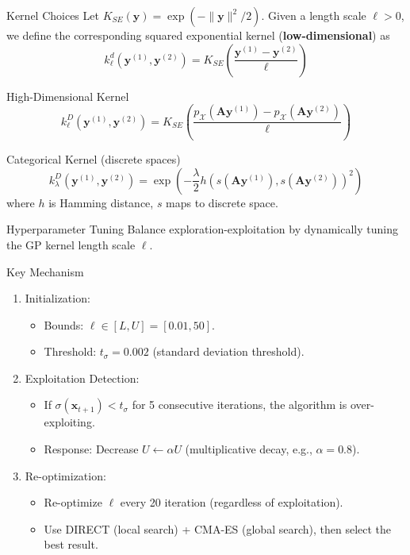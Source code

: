 \documentclass[aspectratio=169]{beamer}
\begin{document}
\begin{frame}{Kernel Choices}
    Let $K_{SE}(\mathbf{y}) = \exp(-\|\mathbf{y}\|^2/2)$.
Given a length scale $\ell > 0$, we define the corresponding {squared exponential} kernel (\textbf{low-dimensional}) as 
    \[
        k_{\ell}^d(\mathbf{y}^{(1)},\mathbf{y}^{(2)}) = K_{SE}\left(\frac{\mathbf{y}^{(1)}-\mathbf{y}^{(2)}}{\ell}\right)
    \]
    \vspace{-0.5cm}
    \begin{block}{High-Dimensional Kernel} 
        \[
        k_{\ell}^D(\mathbf{y}^{(1)}, \mathbf{y}^{(2)}) = K_{SE}\left( \frac{p_{\mathcal{X}}(\mathbf{A}\mathbf{y}^{(1)}) - p_{\mathcal{X}}(\mathbf{A}\mathbf{y}^{(2)})}{\ell} \right)
        \]
    \end{block}
    \vspace{-0.5cm}
    \begin{block}{Categorical Kernel (discrete spaces)}
        \[
        k^D_{\lambda}(\mathbf{y}^{(1)}, \mathbf{y}^{(2)}) = \exp\left(-\frac{\lambda}{2} h(s(\mathbf{A}\mathbf{y}^{(1)}), s(\mathbf{A}\mathbf{y}^{(2)}))^2 \right)
        \]  
        where \( h \) is Hamming distance, \( s \) maps to discrete space.
    \end{block}
\end{frame}

\begin{frame}{Hyperparameter Tuning}
    Balance exploration-exploitation by dynamically tuning the GP kernel length scale $\ell$.
    \begin{block}{Key Mechanism}
        \begin{enumerate}
            \item Initialization:
            \begin{itemize}
                \item Bounds: $\ell \in [L, U] = [0.01, 50]$.
                \item Threshold: $t_\sigma = 0.002$ (standard  deviation threshold).
            \end{itemize}
            \item Exploitation Detection:
            \begin{itemize}
                \item If $\sigma(\mathbf{x}_{t+1}) < t_\sigma$ for 5 consecutive iterations, the algorithm is over-exploiting.
                \item Response: Decrease $U \leftarrow \alpha U$ (multiplicative decay, e.g., $\alpha = 0.8$).
            \end{itemize}
            \item Re-optimization:
            \begin{itemize}
                \item Re-optimize $\ell$ every 20 iteration (regardless of exploitation).
                \item Use DIRECT (local search) + CMA-ES (global search), then select the best result.
            \end{itemize}
        \end{enumerate}
    \end{block}
\end{frame}
\end{document}
